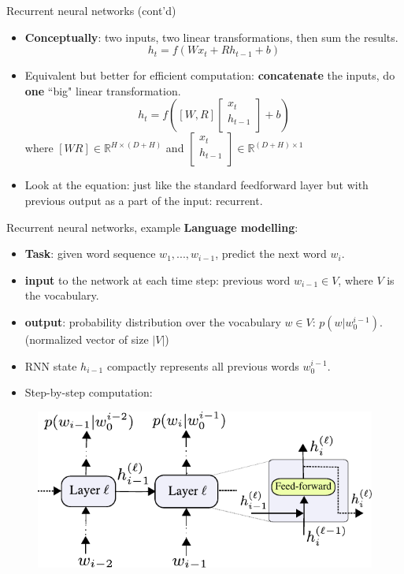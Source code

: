 \begin{frame}{Recurrent neural networks (cont'd)}
\begin{itemize}
\item \textbf{Conceptually}: two inputs, two linear transformations, then sum the results.
\[
h_t = f(W x_t + R h_{t-1} + b)
\]
\item Equivalent but better for efficient computation: \textbf{concatenate} the inputs, do \textbf{one} ``big" linear transformation.
\[
h_t = f( [W, R] 
      \begin{bmatrix}
           x_t \\
           h_{t-1} \\
         \end{bmatrix}
 + b)
\]
where $[W R] \in \mathbb{R}^{H \times (D+H)}$ and
$ \begin{bmatrix} x_t \\ h_{t-1} \\ \end{bmatrix} \in \mathbb{R}^{(D+H) \times 1}$ 
\item Look at the equation: just like the standard feedforward layer but with previous output as a part of the input: recurrent.
\end{itemize}
\end{frame}


\begin{frame}{Recurrent neural networks, example}
\vspace{-5mm}
\textbf{Language modelling}:
\vsp
\begin{itemize}
\item \textbf{Task}: given word sequence $w_1, ..., w_{i-1}$, predict the next word $w_i$.
\item \textbf{input} to the network at each time step: previous word $w_{i-1} \in V$, where $V$ is the vocabulary.
\item \textbf{output}: probability distribution over the vocabulary $w \in V$: $p(w | w_0^{i-1})$.\\ (normalized vector of size $|V|$)
\item RNN state $h_{i-1}$ compactly represents  all previous words $w_0^{i-1}$.
\item Step-by-step computation:
\end{itemize}
\begin{figure}
                        \centering
                        \includegraphics[width=.65\linewidth]{./figures/rnn_lm.pdf}
\end{figure}
\end{frame}

